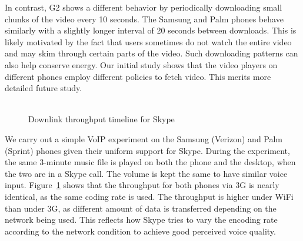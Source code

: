 In contrast, G2 shows a different behavior by periodically 
downloading small chunks of the video every 10 seconds. The Samsung 
and Palm phones behave similarly with a slightly longer interval of 
20 seconds between downloads. This is likely motivated by the fact 
that users sometimes do not watch the entire video and may skim 
through certain parts of the video. Such downloading patterns can 
also help conserve energy. Our initial study shows that the video 
players on different phones employ different policies to fetch video. 
This merits more detailed future study. 




\begin{figure}[t]
\centering
 \\
\small{Downlink throughput timeline for Skype} \\
 \label{fig:voip}
\end{figure}


\label{sec:voip}

We carry out a simple VoIP experiment on the Samsung (Verizon) and Palm (Sprint) phones given their uniform support for Skype. During the experiment, the same 3-minute music file is played on both the phone and the desktop, when the two are in a Skype call. The volume is kept the same to have similar voice input. Figure~\ref{fig:voip} shows that the throughput for both phones via 3G is nearly identical, as the same coding rate is used. The throughput is higher under WiFi than under 3G, as different amount of data is transferred depending on the network being used. This reflects how Skype tries to vary the encoding rate according to the network condition to achieve good perceived voice quality.


%






